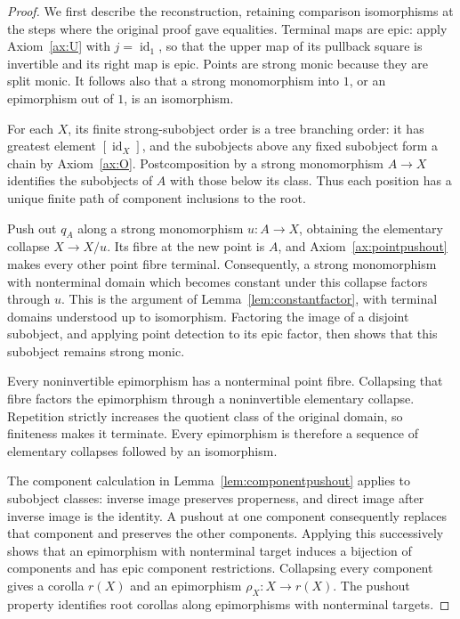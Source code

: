\documentclass[10pt,a4paper]{amsart}
\newcommand{\id}{\operatorname{id}}
\begin{document}
\begin{proof}
We first describe the reconstruction, retaining comparison
isomorphisms at the steps where the original proof gave equalities.
Terminal maps are epic: apply Axiom~\ref{ax:U} with
$j=\id_1$, so that the upper map of its pullback square is
invertible and its right map is epic. Points are strong
monic because they are split monic. It follows also that a
strong monomorphism into $1$, or an epimorphism out of $1$,
is an isomorphism.

For each $X$, its finite strong-subobject order is a tree branching
order: it has greatest element $[\id_X]$, and the subobjects above
any fixed subobject form a chain by Axiom~\ref{ax:O}.
Postcomposition by a strong monomorphism $A\to X$ identifies
the subobjects of $A$ with those below its class. Thus each position
has a unique finite path of component inclusions to the root.

Push out $q_A$ along a strong monomorphism $u:A\to X$, obtaining
the elementary collapse $X\to X/u$. Its fibre at the new point is
$A$, and Axiom~\ref{ax:pointpushout} makes every other point fibre
terminal. Consequently, a strong monomorphism with nonterminal
domain which becomes constant under this collapse factors through
$u$. This is the argument of Lemma~\ref{lem:constantfactor}, with
terminal domains understood up to isomorphism. Factoring the image
of a disjoint subobject, and applying point detection to its epic
factor, then shows that this subobject remains strong monic.

Every noninvertible epimorphism has a nonterminal point fibre.
Collapsing that fibre factors the epimorphism through a
noninvertible elementary collapse. Repetition strictly increases
the quotient class of the original domain, so finiteness makes it
terminate. Every epimorphism is therefore a sequence of elementary
collapses followed by an isomorphism.

The component calculation in
Lemma~\ref{lem:componentpushout} applies to subobject classes:
inverse image preserves properness, and direct image after inverse
image is the identity. A pushout at one component consequently
replaces that component and preserves the other components. Applying
this successively shows that an epimorphism with nonterminal target
induces a bijection of components and has epic component
restrictions. Collapsing every component gives a corolla $r(X)$ and
an epimorphism $\rho_X:X\to r(X)$. The pushout property identifies
root corollas along epimorphisms with nonterminal targets.


\end{proof}
\end{document}
